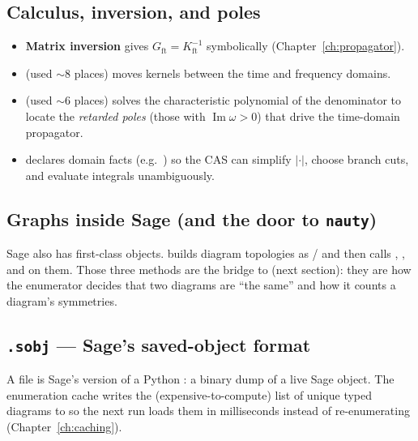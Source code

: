 \subsection{Calculus, inversion, and poles}
\begin{itemize}
  \item \textbf{Matrix inversion} gives $G_{\mathrm{ft}}=K_{\mathrm{ft}}^{-1}$
        symbolically (Chapter~\ref{ch:propagator}).
  \item {} (used $\sim$8 places) moves kernels between the
        time and frequency domains.
  \item {} (used $\sim$6 places) solves the characteristic
        polynomial of the denominator to locate the \emph{retarded poles}
        (those with $\operatorname{Im}\omega>0$) that drive the time-domain
        propagator.
  \item {} declares domain facts (e.g.\ ) so the CAS
        can simplify $|{\cdot}|$, choose branch cuts, and evaluate integrals
        unambiguously.
\end{itemize}

\subsection{Graphs inside Sage (and the door to \texttt{nauty})}
Sage also has first-class  objects.  \Daedalus{} builds diagram
topologies as  /  and then calls
, , and  on
them.  Those three methods are the bridge to  (next section): they
are how the enumerator decides that two diagrams are ``the same'' and how it
counts a diagram's symmetries.

\subsection{\texttt{.sobj} --- Sage's saved-object format}
A  file is Sage's version of a Python : a binary dump of
a live Sage object.  The enumeration cache writes the (expensive-to-compute)
list of unique typed diagrams to  so the
next run loads them in milliseconds instead of re-enumerating
(Chapter~\ref{ch:caching}).

